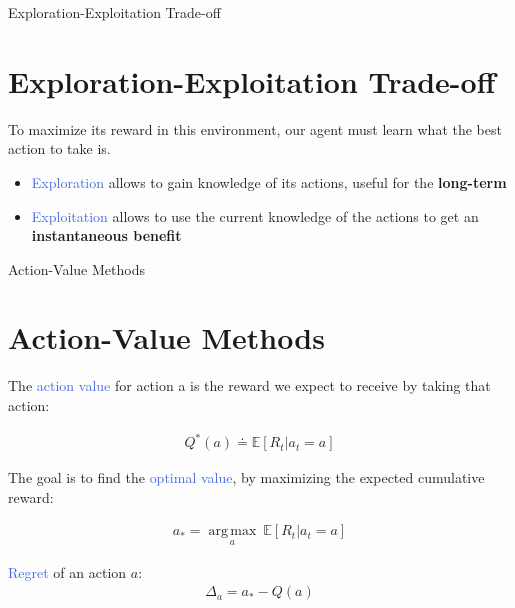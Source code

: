 \documentclass{beamer}
\DeclareMathOperator*{\argmax}{arg\,max}
\begin{document}
\begin{frame}{Exploration-Exploitation Trade-off}
\section{Exploration-Exploitation Trade-off}

To maximize its reward in this environment, our agent must learn what the best action to take is.

\vspace{2mm}
	
\begin{itemize}
    \item \textcolor{RoyalBlue}{Exploration} allows to gain knowledge of its actions, useful for the \textbf{long-term}
   \item \textcolor{RoyalBlue}{Exploitation} allows to use the current knowledge of the actions to get an \textbf{instantaneous benefit}
\end{itemize}

\end{frame}





\begin{frame}{Action-Value Methods}
\section{Action-Value Methods}

The \textcolor{RoyalBlue}{action value} for action a is the reward we expect to receive by taking that action:

\begin{align*}
	Q^{*}(a) \doteq \mathds{E}[R_t|a_t = a]
\end{align*}

The goal is to find the \textcolor{RoyalBlue}{optimal value}, by maximizing the expected cumulative reward:

\begin{align*}
    a_{*} =\underset{a}{\argmax}\:\mathds{E}[R_t|a_t = a]
\end{align*}

\textcolor{RoyalBlue}{Regret} of an action $a$:
\begin{align*}
    \Delta_a = a_{*} - Q(a)
\end{align*}

\end{frame}
\end{document}
